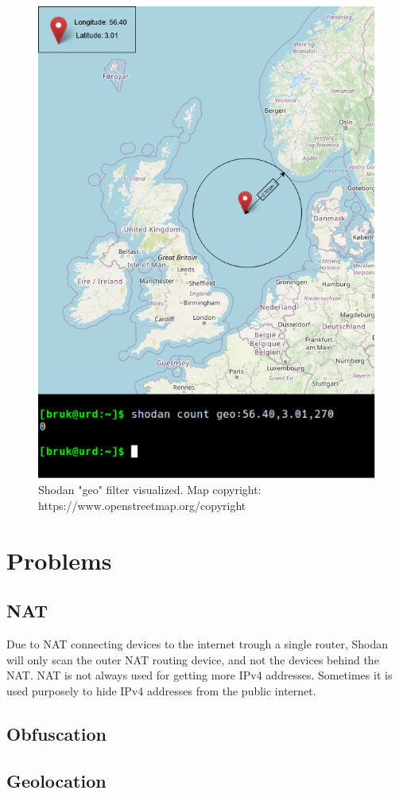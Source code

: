 \begin{figure}
    \centering
    \includegraphics[scale=0.7]{Figurer/geolocation.png}
    \caption{Shodan "geo" filter visualized. Map copyright: https://www.openstreetmap.org/copyright}
    \label{fig:geolocation}
\end{figure}


\section{Problems}
\subsection{NAT}
Due to NAT connecting devices to the internet trough a single router, Shodan will only scan the outer NAT routing device, and not the devices behind the NAT. NAT is not always used for getting more IPv4 addresses. Sometimes it is used purposely to hide IPv4 addresses from the public internet.

\subsection{Obfuscation}

\subsection{Geolocation}